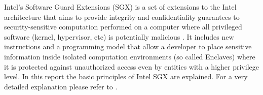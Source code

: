 Intel’s Software Guard Extensions (SGX) is a set of extensions to the Intel architecture that aims to provide integrity and confidentiality guarantees to security-sensitive
computation performed on a computer where all privileged software (kernel, hypervisor, etc) is potentially malicious \cite{Costan2016IntelSE}. It includes new instructions
and a programming model that allow a developer to place sensitive information inside isolated computation environments (so called Enclaves) where it is protected against
unauthorized access even by entities with a higher privilege level. In this report the basic principles of Intel SGX are explained. For a very detailed explanation please refer
to \cite{Costan2016IntelSE}.